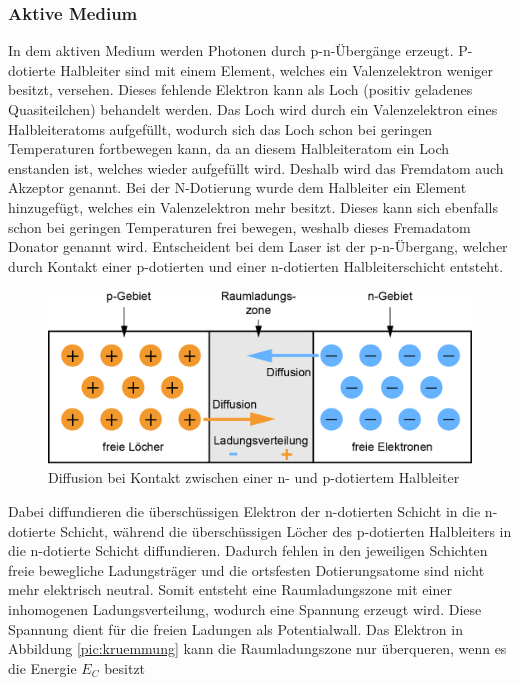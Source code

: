 \subsubsection{Aktive Medium}
\label{subsubsec:aktivesMedium}
In dem aktiven Medium werden Photonen durch p-n-Übergänge erzeugt. P-dotierte Halbleiter sind mit einem Element, welches ein Valenzelektron weniger besitzt, versehen. 
Dieses fehlende Elektron kann als Loch (positiv geladenes Quasiteilchen) behandelt werden.
Das Loch wird durch ein Valenzelektron eines Halbleiteratoms aufgefüllt, wodurch sich das Loch schon bei geringen Temperaturen fortbewegen kann, da an diesem Halbleiteratom ein Loch enstanden ist,
welches wieder aufgefüllt wird. Deshalb wird das Fremdatom auch Akzeptor genannt.
Bei der N-Dotierung wurde dem Halbleiter ein Element hinzugefügt, welches ein Valenzelektron mehr besitzt. Dieses kann sich ebenfalls schon bei geringen Temperaturen frei bewegen,
weshalb dieses Fremadatom Donator genannt wird.
Entscheident bei dem Laser ist der p-n-Übergang, welcher durch Kontakt einer p-dotierten und einer n-dotierten Halbleiterschicht entsteht.
\begin{figure}
    \centering
    \includegraphics{pictures/p-n-uebergang}
    \caption{Diffusion bei Kontakt zwischen einer n- und p-dotiertem Halbleiter\cite{p-n-uebergang}}
    \label{pic:diffusion}
\end{figure}
Dabei diffundieren die überschüssigen Elektron der n-dotierten Schicht in die n-dotierte Schicht, während die überschüssigen Löcher des p-dotierten Halbleiters in die n-dotierte
Schicht diffundieren.
Dadurch fehlen in den jeweiligen Schichten freie bewegliche Ladungsträger und die ortsfesten Dotierungsatome sind nicht mehr elektrisch neutral.  
Somit entsteht eine Raumladungszone mit einer inhomogenen Ladungsverteilung, wodurch eine Spannung erzeugt wird.
Diese Spannung dient für die freien Ladungen als Potentialwall. Das Elektron in Abbildung \ref{pic:kruemmung} kann die Raumladungszone nur überqueren, wenn es die Energie $E_C$ besitzt
